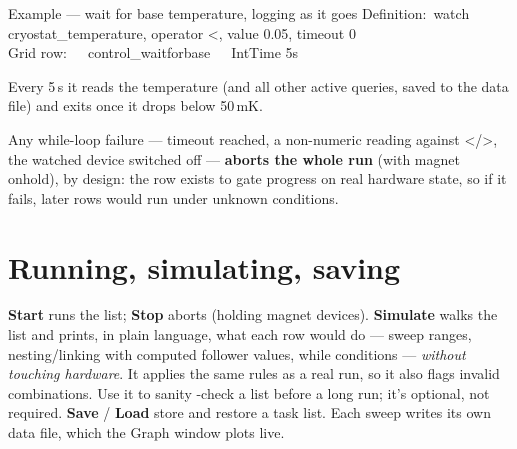 \documentclass[11pt,a4paper]{article}
\newcommand{\code}[1]{{\ttfamily\color{qcode}#1}}
\begin{document}
\begin{gridex}{Example --- wait for base temperature, logging as it goes}
Definition:\ watch cryostat\_temperature, operator <, value 0.05, timeout 0\\
Grid row:\ \ \ control\_waitforbase\ \ \ IntTime 5s
\end{gridex}

\noindent Every 5\,s it reads the temperature (and all other active
queries, saved to the data file) and exits once it drops below 50\,mK.

\begin{warn}
Any while-loop failure --- timeout reached, a non-numeric reading against
\code{<}/\code{>}, the watched device switched off --- \textbf{aborts the whole
run} (with magnet onhold), by design: the row exists to gate progress on real
hardware state, so if it fails, later rows would run under unknown conditions.
\end{warn}

\section{Running, simulating, saving}

\textbf{Start} runs the list; \textbf{Stop} aborts (holding magnet devices).
\textbf{Simulate} walks the list and prints, in plain language, what each row
would do --- sweep ranges, nesting/linking with computed follower values,
while conditions --- \emph{without touching hardware}. It applies the same
rules as a real run, so it also flags invalid combinations. Use it to sanity
-check a list before a long run; it's optional, not required. \textbf{Save} /
\textbf{Load} store and restore a task list. Each sweep writes its own data
file, which the Graph window plots live.
\end{document}
